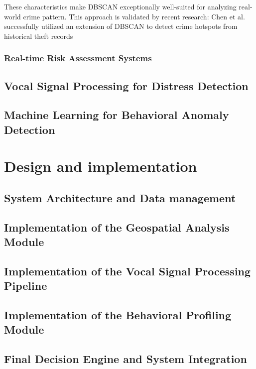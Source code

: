 \documentclass[12pt,a4paper,oneside,english]{book}
\begin{document}
{These characteristics make DBSCAN exceptionally well-suited for analyzing real-world crime pattern.
This approach is validated by recent research: Chen et al. \cite{chen2019exploring} successfully utilized an extension of DBSCAN to detect crime hotspots from historical theft records %



\subsection{Real-time Risk Assessment Systems}%





\section { Vocal Signal Processing for Distress Detection}
\section{Machine Learning for Behavioral Anomaly Detection}


\chapter{Design and implementation}
\label{ch:4eme}
\section{System Architecture and Data management}
\section{Implementation of the Geospatial Analysis Module}
\section{Implementation of the Vocal Signal Processing Pipeline}
\section{Implementation of the Behavioral Profiling Module} %
\section{Final Decision Engine and System Integration}

}
\end{document}
